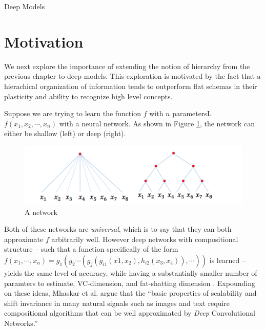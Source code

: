 \documentclass[12pt]{pom_thesis}
\begin{document}
\begin{chapter}{Deep Models}
\section{Motivation}
We next explore the importance of extending the notion of hierarchy from the previous chapter to deep models. This exploration is motivated by the fact that a hierachical organization of information tends to outperform flat schemas in their plasticity and ability to recognize high level concepts.  

Suppose we are trying to learn the function $f$ with $n$ parametersL $f(x_1,x_2,\cdots,x_n)$ with a neural network. As shown in Figure \ref{poggio}, the network can either be shallow (left) or deep (right). \begin{figure}
	\label{poggio}
	\centering
	\includegraphics[width=7in]{poggio}
	\caption{A network}
\end{figure}
Both of these networks are \emph{universal}, which is to say that they can both approximate $f$ arbitrarily well. However deep networks with compositional structure -- such that a function specifically of the form $f(x_1, \cdots, x_n) = g_1(g_2\cdots (g_j(g_{i1}(x1,x_2),h_{i2}(x_3,x_4)),\cdots ))$ is learned -- yields the same level of accuracy, while having a substantially smaller number of paramters to estimate, VC-dimension, and fat-shatting dimension \cite{mhaskar2016learning}. Expounding on these ideas, Mhaskar et al. argue that the ``basic properties of scalability and shift invariance in many natural signals such as images and text require compositional algorithms that can be well approximated by \emph{Deep} Convolutional Networks.'' 

\end{chapter}
\end{document}
